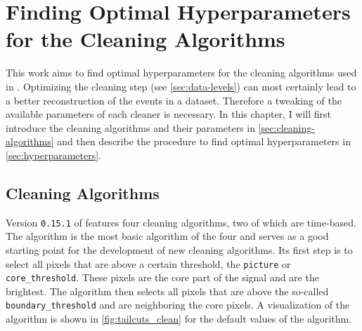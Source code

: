 \chapter{Finding Optimal Hyperparameters for the Cleaning Algorithms}
\label{ch:finding-hyperparams}

This work aims to find optimal hyperparameters for the cleaning algorithms used in \ctapipe{}.
Optimizing the cleaning step (see \autoref{sec:data-levels}) can most certainly lead to a better
reconstruction of the events in a dataset. Therefore a tweaking of the available parameters of each
cleaner is necessary. In this chapter, I will first introduce the cleaning algorithms and their parameters
in \autoref{sec:cleaning-algorithms} and then describe the procedure to find optimal hyperparameters
in \autoref{sec:hyperparameters}.

\section{Cleaning Algorithms}
\label{sec:cleaning-algorithms}

Version \texttt{0.15.1} of \ctapipe{} features four cleaning algorithms, two of which are time-based.
The \tailcuts{} algorithm is the most basic algorithm of the four and serves as a good
starting point for the development of new cleaning algorithms. Its first step is to select all
pixels that are above a certain threshold, the \texttt{picture} or \texttt{core\_threshold}. These
pixels are the core part of the signal and are the brightest. The \tailcuts{} algorithm
then selects all pixels that are above the so-called \texttt{boundary\_threshold} and are neighboring
the core pixels. A visualization of the algorithm is shown in \autoref{fig:tailcuts_clean} for the
default values of the algorithm.

